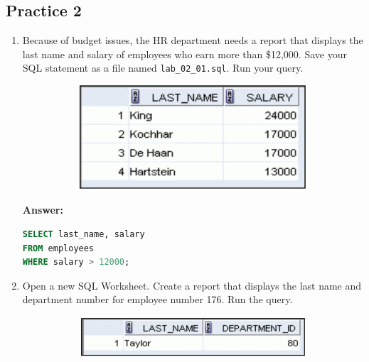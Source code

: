\documentclass[a4paper,12pt]{article}
\begin{document}
\subsection*{Practice 2}
\begin{enumerate}
    \item Because of budget issues, the HR department needs a report that displays the last name and
salary of employees who earn more than \$12,000. Save your SQL statement as a file named
\texttt{lab\_02\_01.sql}. Run your query.
\begin{figure}[h]
        \centering
        \begin{subfigure}[b]{0.4\linewidth}
            \centering
            \includegraphics[width=\linewidth]{graphics/21.png}
        \end{subfigure}
    \end{figure}

    \textbf{Answer: }
    \begin{lstlisting}[language=SQL, label={lst:employees_data}]
SELECT last_name, salary
FROM employees
WHERE salary > 12000;
    \end{lstlisting}
        \item Open a new SQL Worksheet. Create a report that displays the last name and department number
for employee number 176. Run the query.
\begin{figure}[h]
        \centering
        \begin{subfigure}[b]{0.4\linewidth}
            \centering
            \includegraphics[width=\linewidth]{graphics/22.png}
        \end{subfigure}
    \end{figure}


\end{enumerate}
\end{document}

